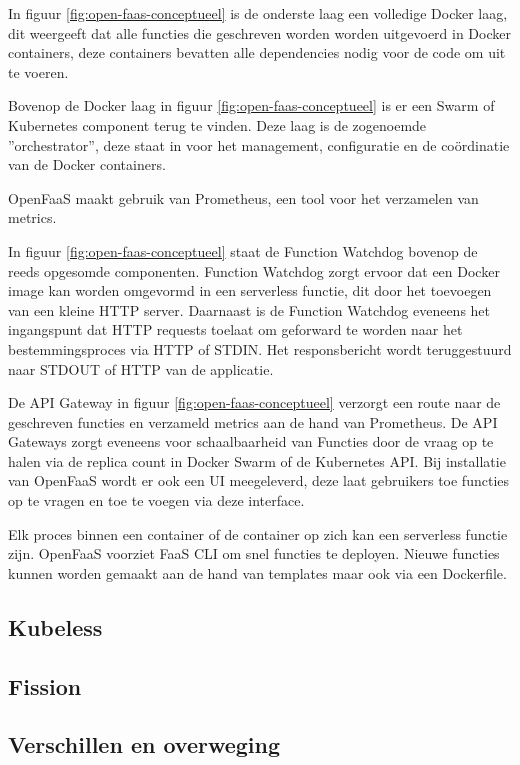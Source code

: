 \begin{description}[style=unboxed, labelwidth=\linewidth, listparindent =0pt]
    \item[Docker laag]
    In figuur \ref{fig:open-faas-conceptueel} is de onderste laag een volledige Docker laag, dit weergeeft dat alle functies die geschreven worden worden uitgevoerd in Docker containers, deze containers bevatten alle dependencies nodig voor de code om uit te voeren.
    \newline
    
    \item[Swarm/Kubernetes]
    Bovenop de Docker laag in figuur \ref{fig:open-faas-conceptueel} is er een Swarm of Kubernetes component terug te vinden. Deze laag is de zogenoemde ''orchestrator'', deze staat in voor het management, configuratie en de coördinatie van de Docker containers.
    \newline
    
    \item[Prometheus]
    OpenFaaS maakt gebruik van Prometheus, een tool voor het verzamelen van metrics.
    \newline
    
    \item[Function Watchdog]
    In figuur \ref{fig:open-faas-conceptueel} staat de Function Watchdog bovenop de reeds opgesomde componenten. Function Watchdog zorgt ervoor dat een Docker image kan worden omgevormd in een serverless functie, dit door het toevoegen van een kleine HTTP server. Daarnaast is de Function Watchdog eveneens het ingangspunt dat HTTP requests toelaat om geforward te worden naar het bestemmingsproces via HTTP of STDIN. Het responsbericht wordt teruggestuurd naar STDOUT of HTTP van de applicatie. \autocite{Ellis2019}
    \newline
    
    \item[API Gateway/UI Portal]
    De API Gateway in figuur \ref{fig:open-faas-conceptueel} verzorgt een route naar de geschreven functies en verzameld metrics aan de hand van Prometheus. De API Gateways zorgt eveneens voor schaalbaarheid van Functies door de vraag op te halen via de replica count in Docker Swarm of de Kubernetes API. Bij installatie van OpenFaaS wordt er ook een UI meegeleverd, deze laat gebruikers toe functies op te vragen en toe te voegen via deze interface. \autocite{Ellis2019} 
    \newline
    
    \item[CLI]
    Elk proces binnen een container of de container op zich kan een serverless functie zijn. OpenFaaS voorziet FaaS CLI om snel functies te deployen. Nieuwe functies kunnen worden gemaakt aan de hand van templates maar ook via een Dockerfile. \autocite{Ellis2019}  
\end{description}

\subsection{Kubeless}


\subsection{Fission}

\subsection{Verschillen en overweging}